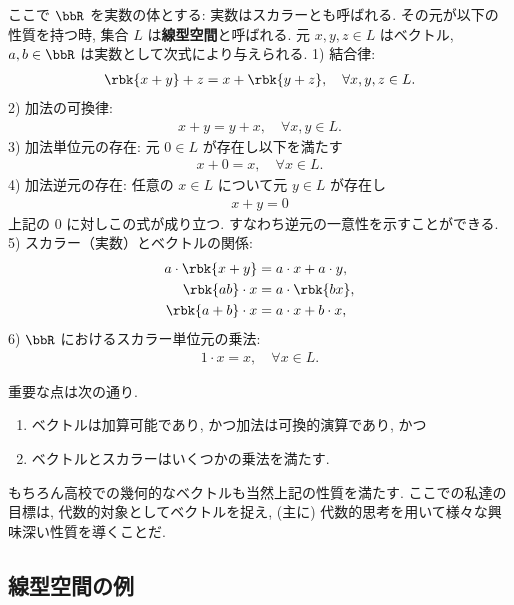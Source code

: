 \documentclass[openany, a4paper, oneside]{jsbook}
\begin{document}
\begin{defn}[線型/ベクトル空間の定義]
ここで $\bbR$ を実数の体とする: 実数はスカラーとも呼ばれる.
その元が以下の性質を持つ時, 集合 $L$ は\textup{\textbf{線型空間}}と呼ばれる.
元 $x, y, z \in L$ はベクトル, $a, b \in \bbR$ は実数として次式により与えられる.
1) 結合律:
 \begin{align}
  \rbk{x + y} + z
  =
  x + \rbk{y + z}, \quad \forall x, y, z \in L.
 \end{align}
2) 加法の可換律:
 \begin{align}
  x + y = y + x,  \quad \forall x, y \in L.
 \end{align}
3) 加法単位元の存在: 元 $0 \in L$ が存在し以下を満たす
 \begin{align}
  x + 0 = x, \quad \forall x \in L.
 \end{align}
4) 加法逆元の存在: 任意の $x \in L$ について元 $y \in L$ が存在し
 \begin{align}
  x + y = 0
 \end{align}
   上記の $0$ に対しこの式が成り立つ.
   すなわち逆元の一意性を示すことができる.
5)  スカラー（実数）とベクトルの関係:
 \begin{align}
  a \cdot \rbk{x + y}
  &=
  a \cdot x + a \cdot y, \\
  \rbk{ab} \cdot x
  &=
  a \cdot \rbk{b x}, \\
  \rbk{a + b} \cdot x
  &=
  a \cdot x + b \cdot x,
 \end{align}
6) $\bbR$ におけるスカラー単位元の乗法:
 \begin{align}
  1 \cdot x = x, \quad \forall x \in L.
 \end{align}
\end{defn}
重要な点は次の通り.
\begin{enumerate}
\item ベクトルは加算可能であり, かつ加法は可換的演算であり, かつ
\item ベクトルとスカラーはいくつかの乗法を満たす.
\end{enumerate}

もちろん高校での幾何的なベクトルも当然上記の性質を満たす.
ここでの私達の目標は, 代数的対象としてベクトルを捉え,
(主に) 代数的思考を用いて様々な興味深い性質を導くことだ.
\subsection{線型空間の例}
\end{document}
